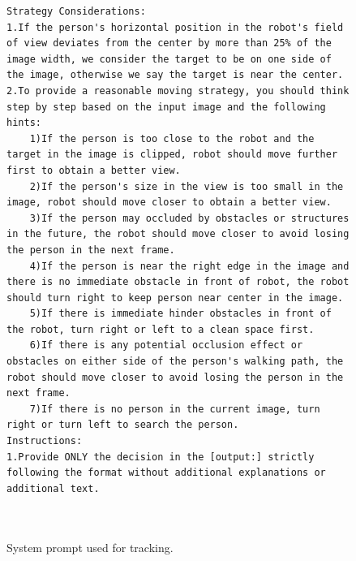 \begin{figure}[htbp]
\begin{tcolorbox}[title=System Prompt used for active tracking]
\begin{lstlisting}[texcl=true, escapechar=|]
Strategy Considerations:
1.If the person's horizontal position in the robot's field of view deviates from the center by more than 25% of the image width, we consider the target to be on one side of the image, otherwise we say the target is near the center. 
2.To provide a reasonable moving strategy, you should think step by step based on the input image and the following hints:
    1)If the person is too close to the robot and the target in the image is clipped, robot should move further first to obtain a better view.
    2)If the person's size in the view is too small in the image, robot should move closer to obtain a better view.
    3)If the person may occluded by obstacles or structures in the future, the robot should move closer to avoid losing the person in the next frame.
    4)If the person is near the right edge in the image and there is no immediate obstacle in front of robot, the robot should turn right to keep person near center in the image.  
    5)If there is immediate hinder obstacles in front of the robot, turn right or left to a clean space first.
    6)If there is any potential occlusion effect or obstacles on either side of the person's walking path, the robot should move closer to avoid losing the person in the next frame.
    7)If there is no person in the current image, turn right or turn left to search the person.
Instructions: 
1.Provide ONLY the decision in the [output:] strictly following the format without additional explanations or additional text.

    
\end{lstlisting}
\end{tcolorbox}
  \caption{System prompt used for tracking.}
    \label{app:prompt_tracking}
\end{figure}

